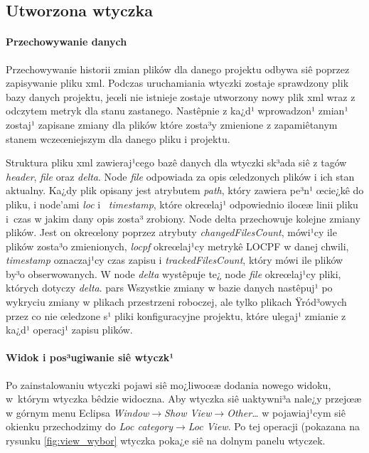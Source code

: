 	\subsection{Utworzona wtyczka}
	
		\paragraph{Przechowywanie danych\\}
	
		Przechowywanie historii zmian plików dla danego projektu odbywa siê poprzez zapisywanie pliku xml.
		Podczas uruchamiania wtyczki zostaje sprawdzony plik bazy danych projektu, jeœli nie istnieje
		zostaje utworzony nowy plik xml wraz z odczytem metryk dla stanu zastanego. Nastêpnie z ka¿d¹
		wprowadzon¹ zmian¹ zostaj¹ zapisane zmiany dla plików które zosta³y zmienione z zapamiêtanym
		stanem wczeœniejszym dla danego pliku i projektu.
		
		Struktura pliku xml zawieraj¹cego bazê danych dla wtyczki sk³ada siê z tagów \textit{header},
		\textit{file} oraz \textit{delta}. Node
		\textit{file} odpowiada za opis œledzonych plików i ich stan aktualny. Ka¿dy plik opisany jest
		atrybutem \textit{path}, który zawiera pe³n¹ œcie¿kê do pliku, i node'ami \textit{loc} i~		
		\textit{timestamp}, które okreœlaj¹ odpowiednio iloœæ linii pliku i~czas w jakim dany opis zosta³
		zrobiony. Node delta przechowuje kolejne zmiany plików. Jest on okreœlony poprzez atrybuty
		\textit{changedFilesCount}, mówi¹cy ile plików zosta³o zmienionych, \textit{locpf} okreœlaj¹cy
		metrykê LOCPF w danej chwili, \textit{timestamp} oznaczaj¹cy czas zapisu i
		\textit{trackedFilesCount}, który mówi ile plików by³o obserwowanych. W node \textit{delta}
		wystêpuje te¿ node \textit{file} okreœlaj¹cy pliki, których dotyczy \textit{delta}.
		pars
		Wszystkie zmiany w bazie danych nastêpuj¹ po wykryciu zmiany w plikach przestrzeni roboczej, ale
		tylko plikach Ÿród³owych przez co nie œledzone s¹ pliki konfiguracyjne projektu, które ulegaj¹
		zmianie z ka¿d¹ operacj¹ zapisu plików.

		\paragraph{Widok i pos³ugiwanie siê wtyczk¹\\}
		
		Po zainstalowaniu wtyczki pojawi siê mo¿liwoœæ dodania nowego widoku, w~którym wtyczka bêdzie
		widoczna. Aby wtyczka siê uaktywni³a nale¿y przejœæ w górnym menu Eclipsa
		\textit{Window$\rightarrow$Show View$\rightarrow$Other\dots} w pojawiaj¹cym siê okienku
		przechodzimy do \textit{Loc category$\rightarrow$Loc View}. Po tej operacji (pokazana na rysunku
		\ref{fig:view_wybor}  wtyczka poka¿e siê na dolnym panelu wtyczek.
		
